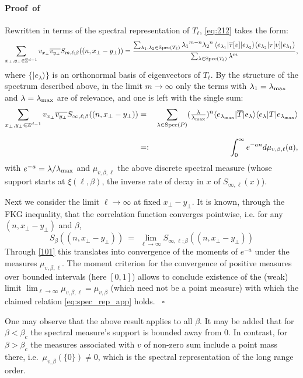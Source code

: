 \documentclass[a4paper,oneside,11pt]{article}
\def\ket#1{|#1\rangle}
\def\bra#1{\langle #1|}
\def\Z{\mathbb{Z}}                          %
\newcommand{\be}[1]{\begin{equation}\label{#1}}
\newcommand{\ee}{\end{equation}}
\numberwithin{equation}{section}
\numberwithin{equation}{section}
\numberwithin{equation}{section}
\newenvironment{proof}[1][\relax]%
  {\paragraph{Proof\ifx#1\relax\else~of #1\fi}}%
  {~\hfill$\square$\par\bigskip}
\def\Z{\mathbb{Z}}                          %
\def\be{\begin{equation}}
\def\ee{\end{equation}}
\begin{document}
\begin{proof}
Rewritten  in terms of the spectral representation of $T_\ell$, \eqref{eq:212} takes the form: 
\be \label{eq:N_inf} 
\sum_{x_\perp,y_\perp\in \Z^{d-1}}v_{x_\perp}\overline{v_{y_\perp}}S_{m,\ell;\beta}((n,x_\perp-y_\perp))
=\frac{\sum_{\lambda_1, \lambda_2\in {\rm Spec}(T_\ell)} {\lambda_1}^{m-n} {\lambda_2}^n\, \bra{e_{\lambda_1}} \overline \tau[v]   \ket{e_{\lambda_2}}\bra{e_{\lambda_2}}   \tau[v]   \ket{e_{\lambda_1}}}{   
\sum_{\lambda\in {\rm Spec}(T_\ell)}
 \lambda^m}, 
\ee 
where $\{\ket{e_\lambda}\}$ is an orthonormal basis of eigenvectors  of $T_\ell $.  
By the structure of the spectrum described above, in the limit $m\to \infty$  only the terms with $\lambda_1= \lambda_{\rm max}$ and  $\lambda= \lambda_{\rm max}$ are of relevance,  and one is left with the single sum:
\begin{eqnarray} \label{101}
\sum_{x_\perp,y_\perp\in \Z^{d-1}}v_{x_\perp}\overline{v_{y_\perp}}S_{\infty,\ell;\beta}((n,x_\perp-y_\perp))
&=&\sum_{\lambda \in {\rm Spec}(P)} (\tfrac{\lambda}{\lambda_{\rm max}})^n  \bra{e_{\lambda_{\rm max}}} \overline T  \ket{e_{\lambda}}\bra{e_{\lambda}}  T  \ket{e_{\lambda_{\rm max}}}  \notag \\[2ex]    
&=: & \int_{0}^\infty e^{-an} d\mu_{v,\beta,\ell} (a),
\end{eqnarray}   
with $ e^{-a} = \lambda/\lambda_{\rm max} $  
and $ \mu_{v,\beta,\ell}$ the above discrete spectral measure (whose support starts at $\xi(\ell,\beta)$, the inverse rate of decay in $x$ of $S_{\infty,\ell}(x)$).   
 
Next we consider the limit $\ell \to \infty$ at fixed $x_\perp-y_\perp$.  It is  known, through the FKG inequality, that the correlation function converges pointwise, i.e.  for any  $(n,x_\perp-y_\perp)$ and 
$\beta$,
\be 
S_{\beta}((n,x_\perp-y_\perp)) \  = \  \lim_{\ell \to \infty} S_{\infty,\ell; \beta}((n,x_\perp-y_\perp)) 
\ee  
Through \eqref{101} this translates into  convergence of the moments of $e^{-a}$ under the measures $\mu_{v,\beta,\ell} $.   The  moment criterion for the convergence of positive measures over  bounded intervals (here  $[0,1]$)  allows to conclude existence of the (weak) limit 
$\lim_{\ell\to \infty} \mu_{v,\beta,\ell} = \mu_{v,\beta}$  
(which need not be a point measure) with which  
the claimed relation  \eqref{eq:spec_rep_app} holds. \end{proof} 

One may observe that the above result applies to all $\beta$.  It may be added that for $\beta <\beta_c$  the  spectral measure's support is bounded away from $0$.  In contrast, for $\beta >\beta_c$ the measures associated with $v$ of non-zero sum  include a point mass there, i.e.~$\mu_{v,\beta} (\{0\}) \neq 0$, which is the spectral representation of the long range order.   
\end{document}
